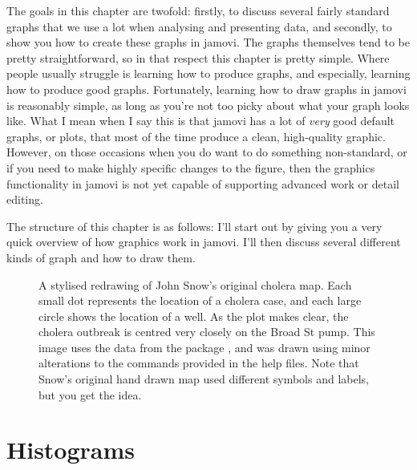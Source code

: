 The goals in this chapter are twofold: firstly, to discuss several fairly standard graphs that we use a lot when analysing and presenting data, and secondly, to show you how to create these graphs in jamovi. The graphs themselves tend to be pretty straightforward, so in that respect this chapter is pretty simple. Where people usually struggle is learning how to produce graphs, and especially, learning how to produce good graphs. Fortunately, learning how to draw graphs in jamovi is reasonably simple, as long as you're not too picky about what your graph looks like. What I mean when I say this is that jamovi has a lot of {\it very} good default graphs, or plots, that most of the time produce a clean, high-quality graphic. However, on those occasions when you do want to do something non-standard, or if you need to make highly specific changes to the figure, then the graphics functionality in jamovi is not yet capable of supporting advanced work or detail editing. 

The structure of this chapter is as follows: I'll start out by giving you a very quick overview of how graphics work in jamovi. I'll then discuss several different kinds of graph and how to draw them. 

\begin{figure}[t!!]
\begin{center}
\caption{A stylised redrawing of John Snow's original cholera map. Each small dot represents the location of a cholera case, and each large circle shows the location of a well. As the plot makes clear, the cholera outbreak is centred very closely on the Broad St pump.  This image uses the data from the  package \protect\cite{Friendly2011}, and was drawn using minor alterations to the commands provided in the help files. Note that Snow's original hand drawn map used different symbols and labels, but you get the idea.}
\label{fig:snowmap1}
\HR
\end{center}
\end{figure}


\section{Histograms\label{sec:hist}}
 
